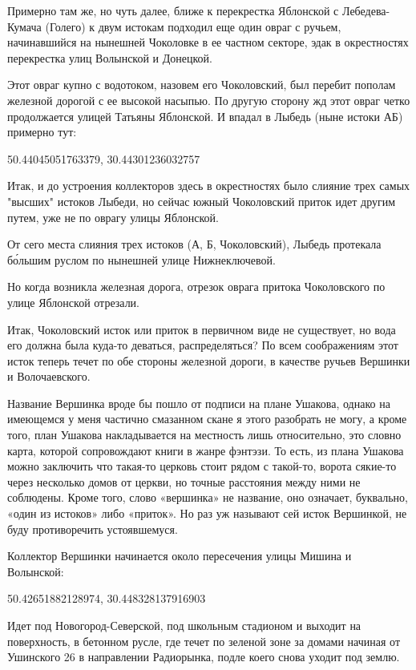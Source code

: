 Примерно там же, но чуть далее, ближе к перекрестка Яблонской с Лебедева-Кумача (Голего) к двум истокам подходил еще один овраг с ручьем, начинавшийся на нынешней Чоколовке в ее частном секторе, эдак в окрестностях перекрестка улиц Волынской и Донецкой.

Этот овраг купно с водотоком, назовем его Чоколовский, был перебит пополам железной дорогой с ее высокой насыпью. По другую сторону жд этот овраг четко продолжается улицей Татьяны Яблонской. И впадал в Лыбедь (ныне истоки АБ) примерно тут:

50.44045051763379, 30.44301236032757

Итак, и до устроения коллекторов здесь в окрестностях было слияние трех самых "высших" истоков Лыбеди, но сейчас южный Чоколовский приток идет другим путем, уже не по оврагу улицы Яблонской. 


От сего места слияния трех истоков (А, Б, Чоколовский), Лыбедь протекала б\'ольшим руслом по нынешней улице Нижнеключевой.

Но когда возникла железная дорога, отрезок оврага притока Чоколовского по улице Яблонской отрезали.

Итак, Чоколовский исток или приток в первичном виде не существует, но вода его должна была куда-то деваться, распределяться? По всем соображениям этот исток теперь течет по обе стороны железной дороги, в качестве ручьев Вершинки и Волочаевского.

Название Вершинка вроде бы пошло от подписи на плане Ушакова, однако на имеющемся у меня частично смазанном скане я этого разобрать не могу, а кроме того, план Ушакова накладывается на местность лишь относительно, это словно карта, которой сопровождают книги в жанре фэнтэзи. То есть, из плана Ушакова можно заключить что такая-то церковь стоит рядом с такой-то, ворота сякие-то через несколько домов от церкви, но точные расстояния между ними не соблюдены. Кроме того, слово «вершинка» не название, оно означает, буквально, «один из истоков» либо «приток». Но раз уж называют сей исток Вершинкой, не буду противоречить устоявшемуся.

Коллектор Вершинки начинается около пересечения улицы Мишина и Волынской:

50.42651882128974, 30.448328137916903

Идет под Новогород-Северской, под школьным стадионом и выходит на поверхность, в бетонном русле, где течет по зеленой зоне за домами начиная от Ушинского 26 в направлении Радиорынка, подле коего снова уходит под землю.

